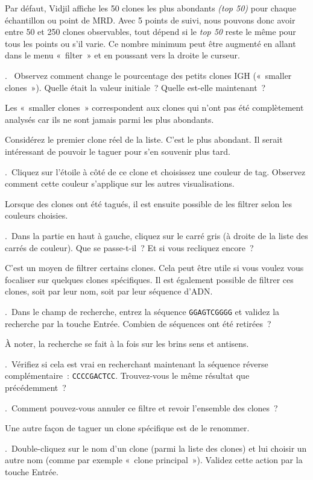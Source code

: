 \documentclass[11pt]{article}
\newcounter{questionum}
\newcommand\com[1]{\textsf{«~#1~»}}
\newcommand\question[1]{\par\noindent\textbf{\thequestionum}.~#1\addtocounter{questionum}{1}}
\begin{document}
Par défaut, Vidjil affiche les 50 clones les plus abondants \textit{(top 50)}
pour chaque échantillon ou point de MRD. Avec 5 points de suivi, nous
pouvons donc avoir entre 50 et 250 clones observables, tout dépend si le
\textit{top 50} reste le même pour tous les points ou s'il varie. Ce nombre
minimum peut être augmenté en allant dans le menu \com{filter} et en
poussant vers la droite le curseur.

\question{  Observez comment change le pourcentage des petits clones IGH («~smaller
  clones~»). Quelle était la valeur initiale~? Quelle est-elle
  maintenant~?}
 Les «~smaller clones~» correspondent aux clones qui n'ont
  pas été complètement analysés car ils ne sont jamais parmi les plus abondants.

\bigskip

Considérez le premier  clone réel de la liste. C'est le plus abondant. Il
serait intéressant de pouvoir le taguer pour s'en souvenir plus tard.

\question{Cliquez sur l'étoile à côté de ce clone et choisissez une couleur de
  tag. Observez comment cette couleur s'applique sur les autres
  visualisations.}

Lorsque des clones ont été tagués, il est ensuite possible de
les filtrer selon les couleurs choisies.

\question{Dans la partie en haut à gauche, cliquez sur le carré gris (à droite
  de la liste des carrés de couleur). Que se passe-t-il~? Et si vous
  recliquez encore~?}

C'est un moyen de filtrer certains clones. Cela peut être utile si vous
voulez vous focaliser sur quelques clones spécifiques. Il est également
possible de filtrer ces clones, soit par leur nom, soit par leur séquence
d'ADN.

\question{Dans le champ de recherche, entrez la séquence \texttt{GGAGTCGGGG} et validez
  la recherche par la touche Entrée. Combien de séquences ont été
  retirées~?} 
À noter, la recherche se fait à la fois sur les brins sens
  et antisens.
\question{Vérifiez si cela est vrai en recherchant maintenant la séquence
  réverse complémentaire~: \texttt{CCCCGACTCC}. Trouvez-vous le même résultat que
  précédemment~?}
\question{Comment pouvez-vous annuler ce filtre et revoir l'ensemble des
  clones~?}

\bigskip

Une autre façon de taguer un clone spécifique est de le renommer.

\question{Double-cliquez sur le nom d'un clone (parmi la liste des clones) et
  lui choisir un autre nom (comme par exemple «~clone principal~»). Validez cette action
  par la touche Entrée.}
\end{document}
